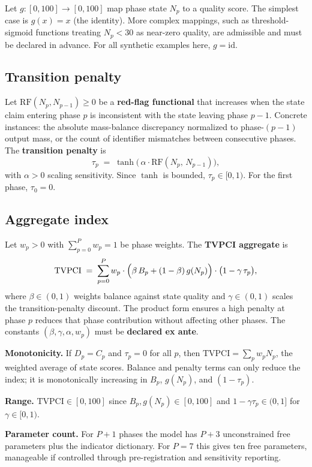 \documentclass[12pt]{article}
\theoremstyle{remark}
\begin{document}
Let $g\colon [0,100] \to [0,100]$ map phase state $N_p$ to a quality score.
The simplest case is $g(x) = x$ (the identity).  More complex mappings, such as
threshold-sigmoid functions treating $N_p < 30$ as near-zero quality, are admissible
and must be declared in advance.  For all synthetic examples here, $g = \mathrm{id}$.

\subsection{Transition penalty}

Let $\mathrm{RF}(N_p, N_{p-1}) \geq 0$ be a \textbf{red-flag functional} that increases
when the state claim entering phase $p$ is inconsistent with the state leaving phase $p-1$.
Concrete instances: the absolute mass-balance discrepancy normalized to phase-$(p-1)$
output mass, or the count of identifier mismatches between consecutive phases.  The
\textbf{transition penalty} is
\[
  \tau_p \;=\; \tanh\!\bigl(\,\alpha \cdot \mathrm{RF}(N_p,\,N_{p-1})\bigr),
\]
with $\alpha > 0$ scaling sensitivity.  Since $\tanh$ is bounded, $\tau_p \in [0,1)$.
For the first phase, $\tau_0 = 0$.

\subsection{Aggregate index}

Let $w_p > 0$ with $\sum_{p=0}^{P} w_p = 1$ be phase weights.  The
\textbf{TVPCI aggregate} is
\[
  \mathrm{TVPCI} \;=\; \sum_{p=0}^{P} w_p
  \cdot \Bigl(\beta\,B_p + (1-\beta)\,g(N_p)\Bigr)
  \cdot \bigl(1 - \gamma\,\tau_p\bigr),
\]
where $\beta \in (0,1)$ weights balance against state quality and $\gamma \in (0,1)$
scales the transition-penalty discount.  The product form ensures a high penalty at
phase $p$ reduces that phase contribution without affecting other phases.
The constants $(\beta, \gamma, \alpha, w_p)$ must be \textbf{declared ex ante}.

\textbf{Monotonicity.}  If $D_p = C_p$ and $\tau_p = 0$ for all $p$, then
$\mathrm{TVPCI} = \sum_p w_p N_p$, the weighted average of state scores.  Balance
and penalty terms can only reduce the index; it is monotonically increasing in
$B_p$, $g(N_p)$, and $(1-\tau_p)$.

\textbf{Range.}  $\mathrm{TVPCI} \in [0,100]$ since $B_p, g(N_p) \in [0,100]$ and
$1 - \gamma\tau_p \in (0,1]$ for $\gamma \in [0,1)$.

\textbf{Parameter count.}  For $P+1$ phases the model has $P + 3$ unconstrained
free parameters plus the indicator dictionary.  For $P = 7$ this gives ten free
parameters, manageable if controlled through pre-registration and sensitivity reporting.
\end{document}
